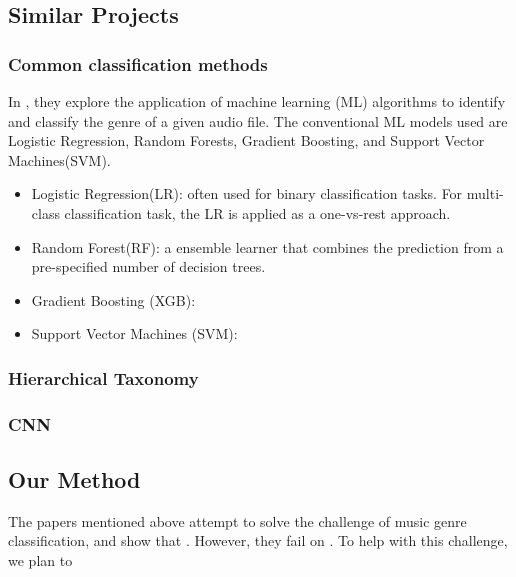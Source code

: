 \subsection{Similar Projects}

\subsubsection{Common classification methods}

In , they explore the application of machine learning (ML) algorithms to identify and classify the genre of a given audio file. The conventional ML models used are Logistic Regression, Random Forests, Gradient Boosting, and Support Vector Machines(SVM).

\begin{itemize}
    \item Logistic Regression(LR): often used for binary classification tasks. For multi-class classification task, the LR is applied as a one-vs-rest approach.
    \item Random Forest(RF): a ensemble learner that combines the prediction from a pre-specified number of decision trees.
    \item Gradient Boosting (XGB):
    \item Support Vector Machines (SVM):
\end{itemize}

\subsubsection{Hierarchical Taxonomy}


\subsubsection{CNN}


\subsection{Our Method}


The papers mentioned above attempt to solve the challenge of music genre classification, and show that . However, they fail on . To help with this challenge, we plan to 
